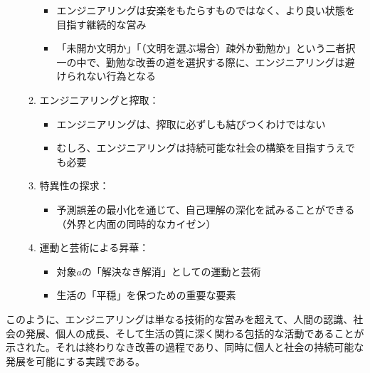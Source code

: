 \begin{enumerate}
\begin{enumerate}
    \begin{itemize}
    \tightlist
    \item
      エンジニアリングは安楽をもたらすものではなく、より良い状態を目指す継続的な営み
    \item
      「未開か文明か」「（文明を選ぶ場合）疎外か勤勉か」という二者択一の中で、勤勉な改善の道を選択する際に、エンジニアリングは避けられない行為となる
    \end{itemize}
  \item
    エンジニアリングと搾取：

    \begin{itemize}
    \tightlist
    \item
      エンジニアリングは、搾取に必ずしも結びつくわけではない
    \item
      むしろ、エンジニアリングは持続可能な社会の構築を目指すうえでも必要
    \end{itemize}
  \item
    特異性の探求：

    \begin{itemize}
    \tightlist
    \item
      予測誤差の最小化を通じて、自己理解の深化を試みることができる（外界と内面の同時的なカイゼン）
    \end{itemize}
  \item
    運動と芸術による昇華：

    \begin{itemize}
    \tightlist
    \item
      対象\(a\)の「解決なき解消」としての運動と芸術
    \item
      生活の「平穏」を保つための重要な要素
    \end{itemize}
  \end{enumerate}
\end{enumerate}

このように、エンジニアリングは単なる技術的な営みを超えて、人間の認識、社会の発展、個人の成長、そして生活の質に深く関わる包括的な活動であることが示された。それは終わりなき改善の過程であり、同時に個人と社会の持続可能な発展を可能にする実践である。
